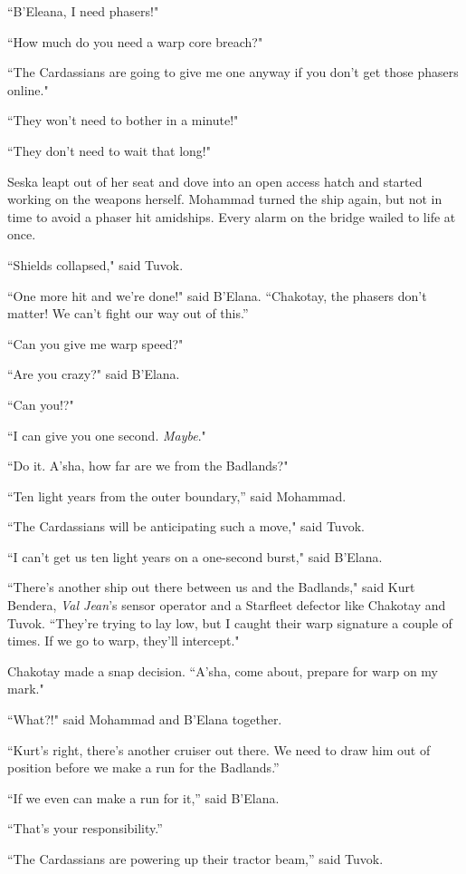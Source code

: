 \documentclass[twoside,letterpaper,12pt]{memoir}
\begin{document}
``B'Eleana, I need phasers!"

``How much do you need a warp core breach?"

``The Cardassians are going to give me one anyway if you don't get those phasers online."

``They won't need to bother in a minute!"

``They don't need to wait that long!"

Seska leapt out of her seat and dove into an open access hatch and started working on the weapons herself. Mohammad turned the ship again, but not in time to avoid a phaser hit amidships. Every alarm on the bridge wailed to life at once.

``Shields collapsed," said Tuvok.

``One more hit and we're done!" said B'Elana. ``Chakotay, the phasers don't matter! We can't fight our way out of this.''

``Can you give me warp speed?"

``Are you crazy?" said B'Elana.

``Can you!?"

``I can give you one second. \textit{Maybe}."

``Do it. A'sha, how far are we from the Badlands?"

``Ten light years from the outer boundary,'' said Mohammad.

``The Cardassians will be anticipating such a move," said Tuvok.

``I can't get us ten light years on a one-second burst," said B'Elana.

``There's another ship out there between us and the Badlands," said Kurt Bendera, \textit{Val Jean}'s sensor operator and a Starfleet defector like Chakotay and Tuvok. ``They're trying to lay low, but I caught their warp signature a couple of times. If we go to warp, they'll intercept."

Chakotay made a snap decision. ``A'sha, come about, prepare for warp on my mark."

``What?!" said Mohammad and B'Elana together.

``Kurt's right, there's another cruiser out there. We need to draw him out of position before we make a run for the Badlands.''

``If we even can make a run for it,'' said B'Elana.

``That's your responsibility.''

``The Cardassians are powering up their tractor beam,'' said Tuvok.
\end{document}
